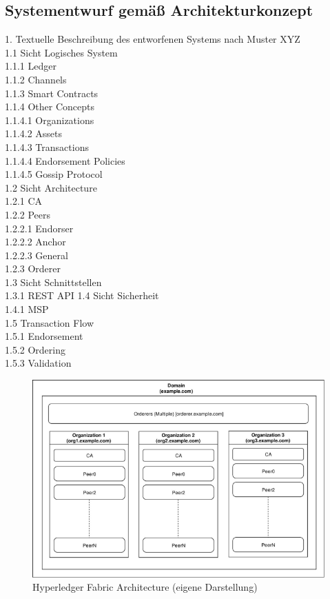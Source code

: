 \subsection{Systementwurf gemäß Architekturkonzept}
1. Textuelle Beschreibung des entworfenen Systems nach Muster XYZ\\
1.1 Sicht Logisches System\\
1.1.1 Ledger\\
1.1.2 Channels\\
1.1.3 Smart Contracts\\
1.1.4 Other Concepts\\
1.1.4.1 Organizations\\
1.1.4.2 Assets\\
1.1.4.3 Transactions\\
1.1.4.4 Endorsement Policies\\
1.1.4.5 Gossip Protocol\\
1.2 Sicht Architecture\\
1.2.1 CA\\
1.2.2 Peers\\
1.2.2.1 Endorser\\
1.2.2.2 Anchor\\
1.2.2.3 General\\
1.2.3 Orderer\\
1.3 Sicht Schnittstellen\\
1.3.1 REST API
1.4 Sicht Sicherheit\\
1.4.1 MSP\\
1.5 Transaction Flow\\
1.5.1 Endorsement\\
1.5.2 Ordering\\
1.5.3 Validation\\

\begin{figure}[H]
	\centering
	\includegraphics[width=1\linewidth]{pictures/hyperledger-fabric-architecture}
	\caption[Hyperledger Fabric Architecture]{Hyperledger Fabric Architecture (eigene Darstellung)}
	\label{fig:hyperledger-fabric-architecture}
\end{figure}

